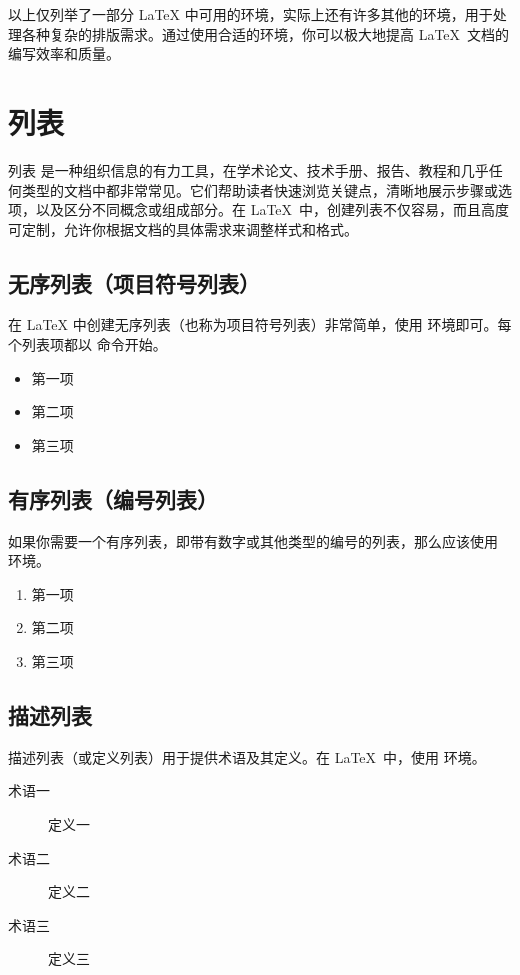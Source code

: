 {{{以上仅列举了一部分 \LaTeX
中可用的环境，实际上还有许多其他的环境，用于处理各种复杂的排版需求。通过使用合适的环境，你可以极大地提高 \LaTeX\ 文档的编写效率和质量。

\section{列表}
列表
是一种组织信息的有力工具，在学术论文、技术手册、报告、教程和几乎任何类型的文档中都非常常见。它们帮助读者快速浏览关键点，清晰地展示步骤或选项，以及区分不同概念或组成部分。在
\LaTeX\ 中，创建列表不仅容易，而且高度可定制，允许你根据文档的具体需求来调整样式和格式。
\subsection{无序列表（项目符号列表）}
在 LaTeX 中创建无序列表（也称为项目符号列表）非常简单，使用  环境即可。每个列表项都以 \texinline{\item} 命令开始。
\begin{texlst}
	\begin{itemize}
		\item 第一项
		\item 第二项
		\item 第三项
	\end{itemize}
\end{texlst}

\subsection{有序列表（编号列表）}
如果你需要一个有序列表，即带有数字或其他类型的编号的列表，那么应该使用  环境。
\begin{texlst}
	\begin{enumerate}
		\item 第一项
		\item 第二项
		\item 第三项
	\end{enumerate}
\end{texlst}

\subsection{描述列表}
描述列表（或定义列表）用于提供术语及其定义。在 \LaTeX\ 中，使用  环境。
\begin{texlst}
	\begin{description}
		\item[术语一] 定义一
		\item[术语二] 定义二
		\item[术语三] 定义三
	\end{description}
\end{texlst}

}}}
